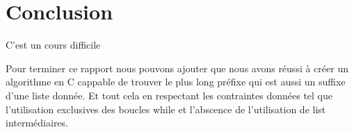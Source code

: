 \section{Conclusion}\label{conclusion}

C'est un cours difficile

Pour terminer ce rapport nous pouvons ajouter que nous avons réussi à créer un algorithme
en C cappable de trouver le plus long préfixe qui est aussi un suffixe d'une liste donnée.
Et tout cela en respectant les contraintes données tel que l'utilisation exclusives des 
boucles while et l'abscence de l'utilisation de list intermédiaires.